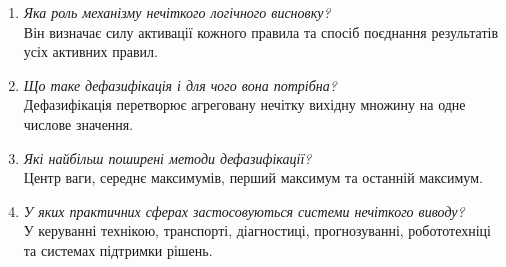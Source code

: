 \documentclass[12pt,a4paper]{article}
\begin{document}
\begin{enumerate}[leftmargin=*]
  Це набір конструкцій IF--THEN, які встановлюють відповідність між комбінаціями вхідних термів і вихідним термом.
  \item \textit{Яка роль механізму нечіткого логічного висновку?}\\
  Він визначає силу активації кожного правила та спосіб поєднання результатів усіх активних правил.
  \item \textit{Що таке дефазифікація і для чого вона потрібна?}\\
  Дефазифікація перетворює агреговану нечітку вихідну множину на одне числове значення.
  \item \textit{Які найбільш поширені методи дефазифікації?}\\
  Центр ваги, середнє максимумів, перший максимум та останній максимум.
  \item \textit{У яких практичних сферах застосовуються системи нечіткого виводу?}\\
  У керуванні технікою, транспорті, діагностиці, прогнозуванні, робототехніці та системах підтримки рішень.
\end{enumerate}
\end{document}
